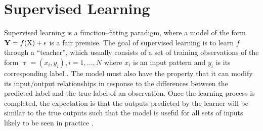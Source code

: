 \section{Supervised Learning} \label{sect:theory:supervised-learning}

Supervised learning is a function--fitting paradigm, where a model of the form $\boldsymbol{\mathbf{Y}} = f(\text{X}) + \epsilon$ is a fair premise. The goal of supervised learning is to learn $f$ through a ``teacher'', which usually consists of a set of training observations of the form $\uptau = (x_i, y_i), i = 1,..., N$ where $x_i$ is an input pattern and $y_i$ is its corresponding label \cite{book:esl}. The model must also have the property that it can modify its input/output relationships in response to the differences between the predicted label and the true label of an observation. Once the learning process is completed, the expectation is that the outputs predicted by the learner will be similar to the true outputs such that the model is useful for all sets of inputs likely to be seen in practice \cite{book:esl}.